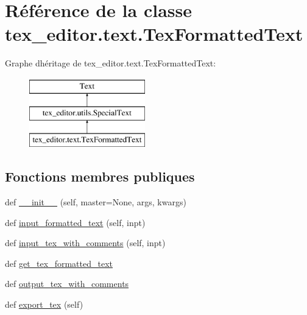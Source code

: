 \hypertarget{classtex__editor_1_1text_1_1_tex_formatted_text}{}\section{Référence de la classe tex\+\_\+editor.\+text.\+Tex\+Formatted\+Text}
\label{classtex__editor_1_1text_1_1_tex_formatted_text}
Graphe d\textquotesingle{}héritage de tex\+\_\+editor.\+text.\+Tex\+Formatted\+Text\+:\begin{figure}[H]
\begin{center}
\leavevmode
\includegraphics[height=3.000000cm]{classtex__editor_1_1text_1_1_tex_formatted_text}
\end{center}
\end{figure}
\subsection*{Fonctions membres publiques}
\begin{DoxyCompactItemize}
\item 
def \hyperlink{classtex__editor_1_1text_1_1_tex_formatted_text_a95e8a9bcd6a678649ca85e0e30c00086}{\+\_\+\+\_\+init\+\_\+\+\_\+} (self, master=None, args, kwargs)
\item 
def \hyperlink{classtex__editor_1_1text_1_1_tex_formatted_text_adb723d51115ad49dfbde9f4ea42d68c5}{input\+\_\+formatted\+\_\+text} (self, inpt)
\item 
def \hyperlink{classtex__editor_1_1text_1_1_tex_formatted_text_a9893cfadcf978e03331bc3f973364ba4}{input\+\_\+tex\+\_\+with\+\_\+comments} (self, inpt)
\item 
def \hyperlink{classtex__editor_1_1text_1_1_tex_formatted_text_af6ad1e3b0b89c55897e2618f2419aec9}{get\+\_\+tex\+\_\+formatted\+\_\+text}
\item 
def \hyperlink{classtex__editor_1_1text_1_1_tex_formatted_text_a68bbdd9ab36f7d589957137f391da74b}{output\+\_\+tex\+\_\+with\+\_\+comments}
\item 
def \hyperlink{classtex__editor_1_1text_1_1_tex_formatted_text_a0a228d24cd6cc84e7deb3000ae7d0664}{export\+\_\+tex} (self)
\end{DoxyCompactItemize}
